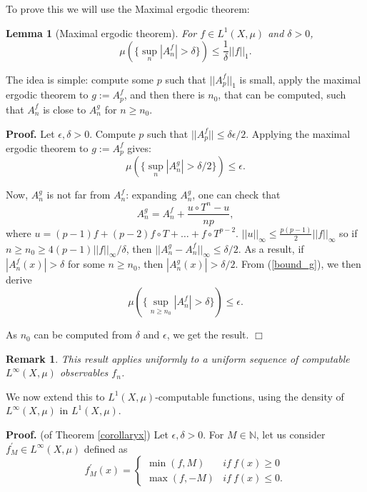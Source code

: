 \documentclass[copyright,creativecommons]{eptcs}
\newtheorem{lemma}{Lemma}
\newtheorem{remark}{Remark}
\numberwithin{equation}{section}
\begin{document}
To prove this we will use the Maximal ergodic theorem:

\begin{lemma}[Maximal ergodic theorem]
\label{lemma_maximal} For $f\in L^{1}(X,\mu )$ and $\delta >0$,
\begin{equation*}
\mu (\{\sup_{n}|A_{n}^{f}|>\delta \})\leq \frac{1}{\delta }||{f}||_{1}.
\end{equation*}
\end{lemma}

The idea is simple: compute some $p$ such that $||A_p^f||_{1}$ is small,
apply the maximal ergodic theorem to $g:=A_{p}^{f}$, and then there is $n_{0} $, that can be computed, such that $A_{n}^{f}$ is close to $A_{n}^{g}$
for $n\geq n_{0}$.

{\bf Proof.}
Let $\epsilon ,\delta >0$. Compute $p$ such that $||{A_{p}^{f}}||\leq \delta
\epsilon /2$. Applying the maximal ergodic theorem to $g:=A_{p}^{f}$ gives:
\begin{equation}
\mu (\{\sup_{n}|A_{n}^{g}|>\delta /2\})\leq \epsilon .  \label{bound_g}
\end{equation}

Now, $A_{n}^{g}$ is not far from $A_{n}^{f}$: expanding $A_{n}^{g}$, one can
check that
\begin{equation*}
A_{n}^{g}=A_{n}^{f}+\frac{u\circ T^{n}-u}{np},
\end{equation*}where $u=(p-1)f+(p-2)f\circ T+\ldots +f\circ T^{p-2}$. $||{u}||_{\infty
}\leq \frac{p(p-1)}{2}||{f}||_{\infty }$ so if $n\geq n_{0}\geq 4(p-1)||{f}||_{\infty }/\delta $, then $||{A_{n}^{g}-A_{n}^{f}}||_{\infty }\leq \delta
/2$. As a result, if $|A_{n}^{f}(x)|>\delta $ for some $n\geq n_{0}$, then $|A_{n}^{g}(x)|>\delta /2$. From (\ref{bound_g}), we then derive
\begin{equation*}
\mu (\{\sup_{n\geq n_{0}}|A_{n}^{f}|>\delta \})\leq \epsilon .
\end{equation*}

As $n_{0}$ can be computed from $\delta $ and $\epsilon $, we get the result.
$\Box $

\begin{remark}
\label{remarkboundunif}This result applies uniformly to a uniform sequence
of computable $L^{\infty }(X,\mu )$ observables $f_{n}$.
\end{remark}

We now extend this to $L^{1}(X,\mu )$-computable functions, using the
density of $L^{\infty }(X,\mu )$ in $L^{1}(X,\mu )$.

{\bf Proof.}
(of Theorem \ref{corollaryx}) Let $\epsilon ,\delta >0$. For $M\in \mathbb{N}
$, let us consider $f_{M}^{\prime }\in L^{\infty }(X,\mu )$ defined as
\begin{equation*}
f_{M}^{\prime }(x)=\left\{
\begin{array}{cc}
\min (f,M) & if~f(x)\geq 0 \\
\max (f,-M) & if~f(x)\leq 0.\end{array}\right.
\end{equation*}
\end{document}
